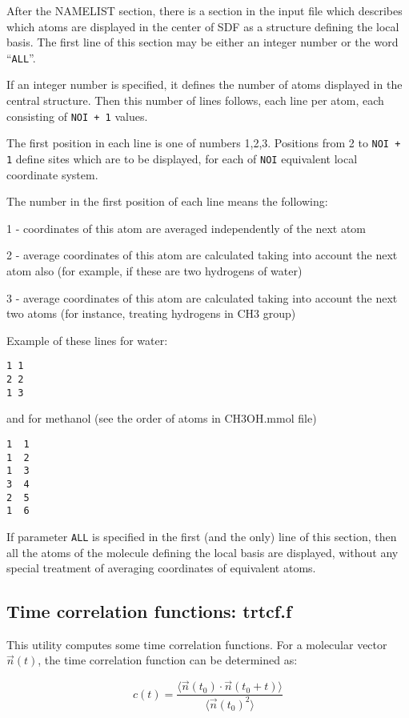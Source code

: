 \documentclass{article}
\begin{document}
After the NAMELIST section, there is a section in the input file 
which describes which atoms are displayed in the center of SDF as
a structure defining the local basis. 
The first line of this section may be either an integer number or
the word ``\verb|ALL|''. 

If an integer number is specified, it defines the number of atoms
displayed in the central structure. Then this number of lines follows,
each line per atom, each consisting of \verb|NOI + 1| values.

The first position in each line is one of numbers 1,2,3.
Positions from 2 to \verb|NOI + 1| define sites which are to be displayed,
for each of \verb|NOI| equivalent local coordinate system.

The number in the first position of each line means the following:

1 - coordinates of this atom are averaged independently of the next atom

2 - average coordinates of this atom are calculated taking into account
the next atom also (for example, if these are two hydrogens of water)

3 - average coordinates of this atom are calculated taking into account
the next two atoms (for instance, treating hydrogens in CH3 group)

Example of these lines for water:
\begin{verbatim}
1 1
2 2 
1 3
\end{verbatim}

and for methanol (see the order of atoms in CH3OH.mmol file)

\begin{verbatim}
1  1
1  2
1  3
3  4
2  5
1  6
\end{verbatim}
 
If parameter \verb|ALL| is specified in the first (and the only) line of 
this section, then all the atoms of the molecule defining the local basis 
are displayed, without any special treatment of averaging coordinates of 
equivalent atoms.

\subsection{Time correlation functions:  trtcf.f}

This utility computes some time correlation functions. For a molecular 
vector $\vec{n}(t)$, the time correlation function can be determined as:

\begin{equation}
\label{TCF}
c(t) = \frac{\langle\vec{n}(t_0)\cdot\vec{n}(t_0+t)\rangle}
{\langle\vec{n}(t_0)^2\rangle}
\end{equation}
\end{document}
